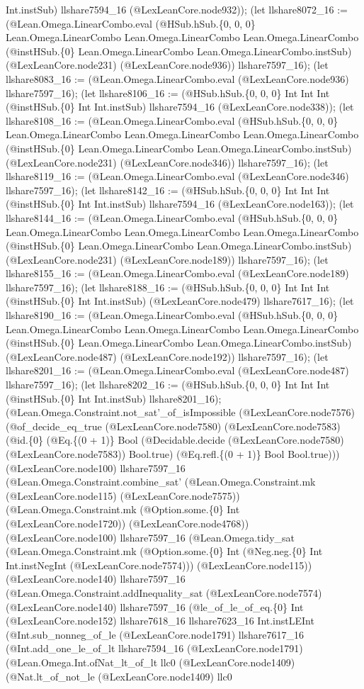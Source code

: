 \documentclass[11pt]{article}
\begin{document}
Int.instSub) llshare7594\_16 (@LexLeanCore.node932)); (let llshare8072\_16 := (@Lean.Omega.LinearCombo.eval (@HSub.hSub.\{0, 0, 0\} Lean.Omega.LinearCombo Lean.Omega.LinearCombo Lean.Omega.LinearCombo (@instHSub.\{0\} Lean.Omega.LinearCombo Lean.Omega.LinearCombo.instSub) (@LexLeanCore.node231) (@LexLeanCore.node936)) llshare7597\_16); (let llshare8083\_16 := (@Lean.Omega.LinearCombo.eval (@LexLeanCore.node936) llshare7597\_16); (let llshare8106\_16 := (@HSub.hSub.\{0, 0, 0\} Int Int Int (@instHSub.\{0\} Int Int.instSub) llshare7594\_16 (@LexLeanCore.node338)); (let llshare8108\_16 := (@Lean.Omega.LinearCombo.eval (@HSub.hSub.\{0, 0, 0\} Lean.Omega.LinearCombo Lean.Omega.LinearCombo Lean.Omega.LinearCombo (@instHSub.\{0\} Lean.Omega.LinearCombo Lean.Omega.LinearCombo.instSub) (@LexLeanCore.node231) (@LexLeanCore.node346)) llshare7597\_16); (let llshare8119\_16 := (@Lean.Omega.LinearCombo.eval (@LexLeanCore.node346) llshare7597\_16); (let llshare8142\_16 := (@HSub.hSub.\{0, 0, 0\} Int Int Int (@instHSub.\{0\} Int Int.instSub) llshare7594\_16 (@LexLeanCore.node163)); (let llshare8144\_16 := (@Lean.Omega.LinearCombo.eval (@HSub.hSub.\{0, 0, 0\} Lean.Omega.LinearCombo Lean.Omega.LinearCombo Lean.Omega.LinearCombo (@instHSub.\{0\} Lean.Omega.LinearCombo Lean.Omega.LinearCombo.instSub) (@LexLeanCore.node231) (@LexLeanCore.node189)) llshare7597\_16); (let llshare8155\_16 := (@Lean.Omega.LinearCombo.eval (@LexLeanCore.node189) llshare7597\_16); (let llshare8188\_16 := (@HSub.hSub.\{0, 0, 0\} Int Int Int (@instHSub.\{0\} Int Int.instSub) (@LexLeanCore.node479) llshare7617\_16); (let llshare8190\_16 := (@Lean.Omega.LinearCombo.eval (@HSub.hSub.\{0, 0, 0\} Lean.Omega.LinearCombo Lean.Omega.LinearCombo Lean.Omega.LinearCombo (@instHSub.\{0\} Lean.Omega.LinearCombo Lean.Omega.LinearCombo.instSub) (@LexLeanCore.node487) (@LexLeanCore.node192)) llshare7597\_16); (let llshare8201\_16 := (@Lean.Omega.LinearCombo.eval (@LexLeanCore.node487) llshare7597\_16); (let llshare8202\_16 := (@HSub.hSub.\{0, 0, 0\} Int Int Int (@instHSub.\{0\} Int Int.instSub) llshare8201\_16); (@Lean.Omega.Constraint.not\_sat'\_of\_isImpossible (@LexLeanCore.node7576) (@of\_decide\_eq\_true (@LexLeanCore.node7580) (@LexLeanCore.node7583) (@id.\{0\} (@Eq.\{(0 + 1)\} Bool (@Decidable.decide (@LexLeanCore.node7580) (@LexLeanCore.node7583)) Bool.true) (@Eq.refl.\{(0 + 1)\} Bool Bool.true))) (@LexLeanCore.node100) llshare7597\_16 (@Lean.Omega.Constraint.combine\_sat' (@Lean.Omega.Constraint.mk (@LexLeanCore.node115) (@LexLeanCore.node7575)) (@Lean.Omega.Constraint.mk (@Option.some.\{0\} Int (@LexLeanCore.node1720)) (@LexLeanCore.node4768)) (@LexLeanCore.node100) llshare7597\_16 (@Lean.Omega.tidy\_sat (@Lean.Omega.Constraint.mk (@Option.some.\{0\} Int (@Neg.neg.\{0\} Int Int.instNegInt (@LexLeanCore.node7574))) (@LexLeanCore.node115)) (@LexLeanCore.node140) llshare7597\_16 (@Lean.Omega.Constraint.addInequality\_sat (@LexLeanCore.node7574) (@LexLeanCore.node140) llshare7597\_16 (@le\_of\_le\_of\_eq.\{0\} Int (@LexLeanCore.node152) llshare7618\_16 llshare7623\_16 Int.instLEInt (@Int.sub\_nonneg\_of\_le (@LexLeanCore.node1791) llshare7617\_16 (@Int.add\_one\_le\_of\_lt llshare7594\_16 (@LexLeanCore.node1791) (@Lean.Omega.Int.ofNat\_lt\_of\_lt llc0 (@LexLeanCore.node1409) (@Nat.lt\_of\_not\_le (@LexLeanCore.node1409) llc0 
\end{document}
